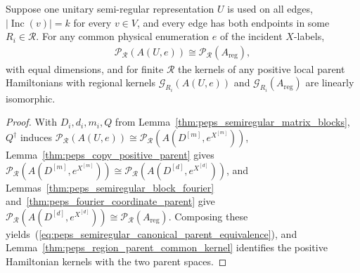 \begin{lemma}%
    \label{thm:peps_semiregular_canonical_parent_equivalence}
    \leanok
    Suppose one unitary semi-regular representation $U$ is used on all
    edges, $|\operatorname{Inc}(v)|=k$ for every $v\in V$, and every edge
    has both endpoints in some $R_i\in\mathcal R$. For any common physical
    enumeration $e$ of the incident $X$-labels,
    \begin{align}
        \mathcal P_{\mathcal R}(A(U,e))
        \cong\mathcal P_{\mathcal R}(A_{\mathrm{reg}}),
        \label{eq:peps_semiregular_canonical_parent_equivalence}
    \end{align}
    with equal dimensions, and for finite $\mathcal R$ the kernels of any
    positive local parent Hamiltonians with regional kernels
    $\mathcal G_{R_i}(A(U,e))$ and $\mathcal G_{R_i}(A_{\mathrm{reg}})$ are
    linearly isomorphic.
\end{lemma}
\begin{proof}\leanok
    With $D_i,d_i,m_i,Q$ from Lemma~\ref{thm:peps_semiregular_matrix_blocks},
    $Q^\dagger$ induces $\mathcal P_{\mathcal R}(A(U,e))\cong\mathcal P_{\mathcal R}(A(D^{[m]},e^{X^{[m]}}))$,
    Lemma~\ref{thm:peps_copy_positive_parent} gives
    $\mathcal P_{\mathcal R}(A(D^{[m]},e^{X^{[m]}}))\cong\mathcal P_{\mathcal R}(A(D^{[d]},e^{X^{[d]}}))$,
    and Lemmas~\ref{thm:peps_semiregular_block_fourier}
    and~\ref{thm:peps_fourier_coordinate_parent} give
    $\mathcal P_{\mathcal R}(A(D^{[d]},e^{X^{[d]}}))\cong\mathcal P_{\mathcal R}(A_{\mathrm{reg}})$.
    Composing these yields~(\ref{eq:peps_semiregular_canonical_parent_equivalence}),
    and Lemma~\ref{thm:peps_region_parent_common_kernel} identifies the
    positive Hamiltonian kernels with the two parent spaces.
\end{proof}

